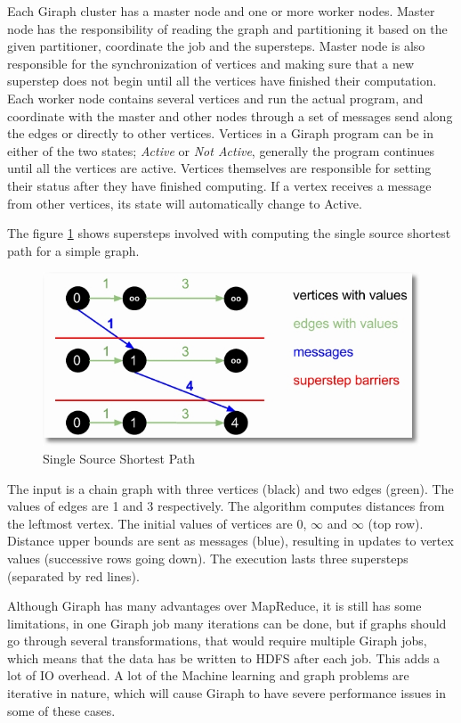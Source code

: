 \documentclass[english]{tktltiki}
\begin{document}
Each Giraph cluster has a master node and one or more worker nodes. Master node has the responsibility of reading the graph and partitioning it based on the given partitioner, coordinate the job and the supersteps. Master node is also responsible for the synchronization of vertices and making sure that a new superstep does not begin until all the vertices have finished their computation. Each worker node contains several vertices and run the actual program, and coordinate with the master and other nodes through a set of messages send along the edges or directly to other vertices. Vertices in a Giraph program can be in either of the two states; \textit{Active} or \textit{Not Active}, generally the program continues until all the vertices are active. Vertices themselves are responsible for setting their status after they have finished computing. If a vertex receives a message from other vertices, its state will automatically change to Active.

The figure \ref{fig:sssp} shows supersteps involved with computing the single source shortest path for a simple graph.
\begin{figure}[ht!]
\centering
\includegraphics[width=150mm]{figures/giraphsuperstep.jpg}
\caption{Single Source Shortest Path  \protect \footnotemark}
\label{fig:sssp}
\end{figure}

The input is a chain graph with three vertices (black) and two edges (green). The values of edges are 1 and 3 respectively. The algorithm computes distances from the leftmost vertex. The initial values of vertices are 0, $\infty$ and $\infty$ (top row). Distance upper bounds are sent as messages (blue), resulting in updates to vertex values (successive rows going down). The execution lasts three supersteps (separated by red lines).

Although Giraph has many advantages over MapReduce, it is still has some limitations, in one Giraph job many iterations can be done, but if graphs should go through several transformations, that would require multiple Giraph jobs, which means that the data has be written to HDFS after each job. This adds a lot of IO overhead. A lot of the Machine learning and graph problems are iterative in nature, which will cause Giraph to have severe performance issues in some of these cases.
\end{document}

